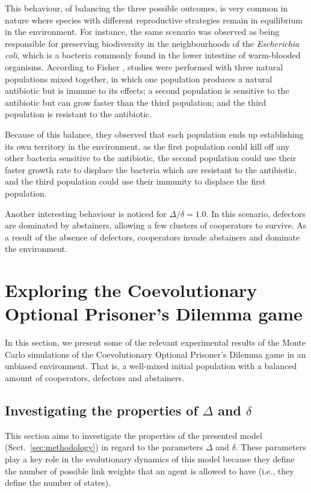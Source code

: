 \documentclass{llncs}
\begin{document}
This behaviour, of balancing the three possible outcomes, is very common in
nature where species with different reproductive strategies remain in
equilibrium in the environment. For instance, the same scenario was observed as
being responsible for preserving biodiversity in the neighbourhoods of the
\textit{Escherichia coli}, which is a bacteria commonly found in the lower
intestine of warm-blooded organisms. According to Fisher \cite{Fisher2008},
studies were performed with three natural populations mixed together, in which
one population produces a natural antibiotic but is immune to its effects; a
second population is sensitive to the antibiotic but can grow faster than the
third population; and the third population is resistant to the antibiotic.

Because of this balance, they observed that each population ends up
establishing its own territory in the environment, as the first population
could kill off any other bacteria sensitive to the antibiotic, the second
population could use their faster growth rate to displace the bacteria which
are resistant to the antibiotic, and the third population could use their
immunity to displace the first population.

Another interesting behaviour is noticed for $\Delta/\delta=1.0$. In this
scenario, defectors are dominated by abstainers, allowing a few clusters of
cooperators to survive. As a result of the absence of defectors, cooperators
invade abstainers and dominate the environment.


\section{Exploring the Coevolutionary Optional Prisoner's Dilemma game}
\label{sec:results2}

In this section, we present some of the relevant experimental results of the
Monte Carlo simulations of the Coevolutionary Optional Prisoner's Dilemma game
in an unbiased environment. That is, a well-mixed initial population with a
balanced amount of cooperators, defectors and abstainers.

\subsection{Investigating the properties of $\Delta$ and $\delta$}
\label{sec:delta}

This section aims to investigate the properties of the presented model
(Sect.~\ref{sec:methodology}) in regard to the parameters $\Delta$ and
$\delta$. These parameters play a key role in the evolutionary dynamics of this
model because they define the number of possible link weights that an agent is
allowed to have (i.e., they define the number of states).
\end{document}

